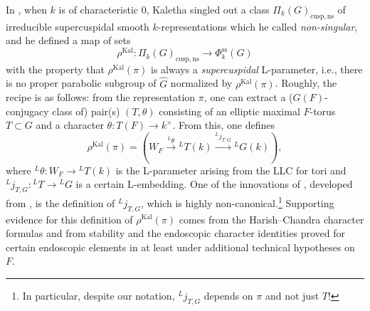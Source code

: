 \documentclass[reqno]{amsart}
\numberwithin{equation}{subsection}
\newcommand{\wh}[1]{\widehat{#1}}
\newcommand{\co}{\colon}
\newcommand{\ld}{{}^L}
\DeclareMathOperator{\Kal}{Kal}
\renewcommand{\ss}{\mathrm{ss}}
\theoremstyle{remark}
\numberwithin{equation}{subsection}
\numberwithin{figure}{subsection}
\begin{document}
In \cite{Kal21b}, when $k$ is of characteristic $0$, Kaletha singled out a class $\Pi_k(G)_{\mathrm{cusp,ns}}$ of irreducible supercuspidal smooth $k$-representations which he called \emph{non-singular}, and he defined a map of sets
\[
\rho^{\Kal}\co \Pi_k(G)_{\mathrm{cusp,ns}} \to \Phi_k^{\ss}(G)
\]
with the property that $\rho^{\Kal}(\pi)$ is always a \emph{supercuspidal} L-parameter, i.e., there is no proper parabolic subgroup of $\wh G$ normalized by $\rho^{\Kal}(\pi)$. Roughly, the recipe is as follows: from the representation $\pi$, one can extract a ($G(F)$-conjugacy class of) pair(s) $(T, \theta)$ consisting of an elliptic maximal $F$-torus $T \subset G$ and a character $\theta\co T(F) \to k^\times$. From this, one defines
\begin{equation}\label{eqn:I-intro-kal-defn}
\rho^{\Kal}(\pi) = \left(W_F \xrightarrow{\ld\theta} \ld T(k) \xrightarrow{\ld j_{T,G}} \ld G(k)\right),
\end{equation}
where $\ld\theta\co W_F \to \ld T(k)$ is the L-parameter arising from the LLC for tori and $\ld j_{T,G} \co \ld T \to \ld G$ is a certain L-embedding. One of the innovations of \cite{Kal21b}, developed from \cite{FKS23}, is the definition of $\ld j_{T,G}$, which is highly non-canonical.\footnote{In particular, despite our notation, $\ld j_{T,G}$ depends on $\pi$ and not just $T$!} Supporting evidence for this definition of $\rho^{\Kal}(\pi)$ comes from the Harish--Chandra character formulas and from stability and the endoscopic character identities proved for certain endoscopic elements in \cite[\S 4.3, Theorem 4.4.4]{FKS23} at least under additional technical hypotheses on $F$. 

\end{document}
